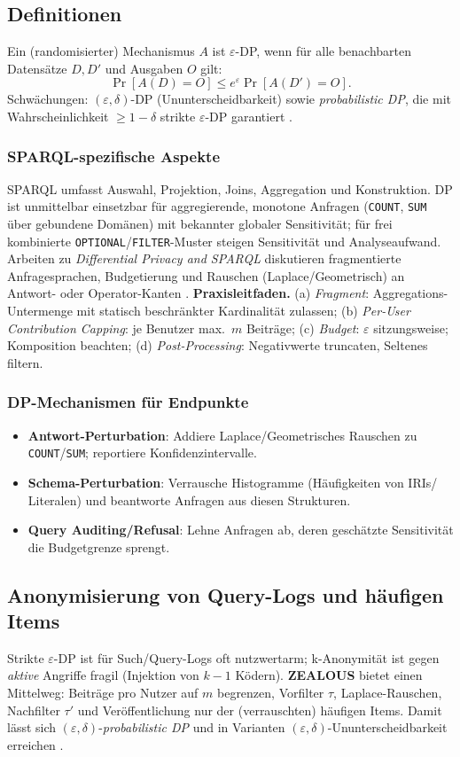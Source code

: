 \subsection{Definitionen}
Ein (randomisierter) Mechanismus $A$ ist $\varepsilon$-DP, wenn für alle benachbarten Datensätze $D,D'$ und Ausgaben $O$ gilt:
\[
\Pr[A(D)=O]\le e^{\varepsilon}\Pr[A(D')=O].
\]
Schwächungen: $(\varepsilon,\delta)$-DP (Ununterscheidbarkeit) sowie \emph{probabilistic DP}, die mit Wahrscheinlichkeit $\ge 1-\delta$ strikte $\varepsilon$-DP garantiert \cite{GoetzZealous}.

\subsubsection{SPARQL-spezifische Aspekte}
SPARQL umfasst Auswahl, Projektion, Joins, Aggregation und Konstruktion. DP ist unmittelbar einsetzbar für aggregierende, monotone Anfragen (\texttt{COUNT}, \texttt{SUM} über gebundene Domänen) mit bekannter globaler Sensitivität; für frei kombinierte \texttt{OPTIONAL}/\texttt{FILTER}-Muster steigen Sensitivität und Analyseaufwand. Arbeiten zu \emph{Differential Privacy and SPARQL} diskutieren fragmentierte Anfragesprachen, Budgetierung und Rauschen (Laplace/Geometrisch) an Antwort- oder Operator-Kanten \cite{BuilArandaDPSPARQL}. 
\textbf{Praxisleitfaden.} 
(a) \emph{Fragment}: Aggregations-Untermenge mit statisch beschränkter Kardinalität zulassen; 
(b) \emph{Per-User Contribution Capping}: je Benutzer max.\ $m$ Beiträge; 
(c) \emph{Budget}: $\varepsilon$ sitzungsweise; Komposition beachten; 
(d) \emph{Post-Processing}: Negativwerte truncaten, Seltenes filtern.

\subsubsection{DP-Mechanismen für Endpunkte}
\begin{itemize}
  \item \textbf{Antwort-Perturbation}: Addiere Laplace/Geometrisches Rauschen zu \texttt{COUNT}/\texttt{SUM}; reportiere Konfidenzintervalle.
  \item \textbf{Schema-Perturbation}: Verrausche Histogramme (Häufigkeiten von IRIs/ Literalen) und beantworte Anfragen aus diesen Strukturen.
  \item \textbf{Query Auditing/Refusal}: Lehne Anfragen ab, deren geschätzte Sensitivität die Budgetgrenze sprengt.
\end{itemize}

\subsection{Anonymisierung von Query-Logs und häufigen Items}
Strikte $\varepsilon$-DP ist für Such/Query-Logs oft nutzwertarm; k-Anonymität ist gegen \emph{aktive} Angriffe fragil (Injektion von $k\!-\!1$ Ködern). \textbf{ZEALOUS} bietet einen Mittelweg: Beiträge pro Nutzer auf $m$ begrenzen, Vorfilter $\tau$, Laplace-Rauschen, Nachfilter $\tau'$ und Veröffentlichung nur der (verrauschten) häufigen Items. Damit lässt sich $(\varepsilon,\delta)$-\emph{probabilistic DP} und in Varianten $(\varepsilon,\delta)$-Ununterscheidbarkeit erreichen \cite{GoetzZealous}. 
